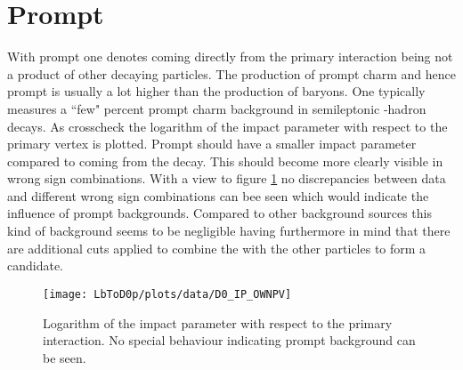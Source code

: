 \section{Prompt \Dz}
With prompt \Dz one denotes \Dz coming directly from the primary \proton\proton interaction being not a product of other decaying particles.
The production of prompt charm and hence prompt \Dz is usually a lot higher than the production of \Lb baryons. 
One typically measures a ``few" percent prompt charm background in semileptonic \bquark-hadron decays.
As crosscheck the logarithm of the \Dz impact parameter with respect to the primary vertex is plotted.
Prompt \Dz should have a smaller impact parameter compared to \Dz coming from the \Lb decay.
This should become more clearly visible in wrong sign combinations.
With a view to figure \ref{fig:plot_D0_IP} no discrepancies between data and different wrong sign combinations can bee seen which would indicate the influence of prompt \Dz backgrounds.
Compared to other background sources this kind of background seems to be negligible having furthermore in mind that there are additional cuts applied to combine the \Dz with the other particles to form a \Lb candidate.
\begin{figure}[hptb]
	\centering
	\texttt{[image: LbToD0p/plots/data/D0\_IP\_OWNPV]}
	\caption{Logarithm of the \Dz impact parameter with respect to the primary \proton\proton interaction. No special behaviour indicating prompt \Dz background can be seen.}
	\label{fig:plot_D0_IP}
\end{figure}

